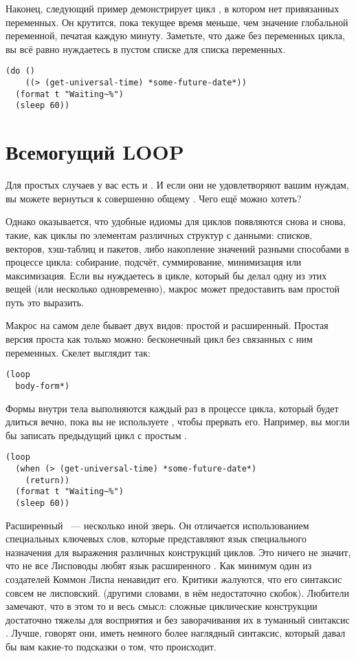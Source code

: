 Наконец, следующий пример демонстрирует цикл , в котором нет привязанных
переменных. Он крутится, пока текущее время меньше, чем значение глобальной переменной,
печатая  каждую минуту. Заметьте, что даже без переменных цикла, вы всё равно
нуждаетесь в пустом списке для списка переменных.

\begin{lstlisting}
(do ()
    ((> (get-universal-time) *some-future-date*))
  (format t "Waiting~%")
  (sleep 60)) 
\end{lstlisting}

\section{Всемогущий LOOP}

Для простых случаев у вас есть  и . И если они не удовлетворяют
вашим нуждам, вы можете вернуться к совершенно общему . Чего ещё можно хотеть?

Однако оказывается, что удобные идиомы для циклов появляются снова и снова, такие, как
циклы по элементам различных структур с данными: списков, векторов, хэш-таблиц и пакетов,
либо накопление значений разными способами в процессе цикла: собирание, подсчёт,
суммирование, минимизация или максимизация. Если вы нуждаетесь в цикле, который бы делал
одну из этих вещей (или несколько одновременно), макрос  может предоставить вам
простой путь это выразить.

Макрос  на самом деле бывает двух видов: простой и расширенный. Простая версия
проста как только можно: бесконечный цикл без связанных с ним переменных. Скелет выглядит
так:

\begin{lstlisting}
(loop
  body-form*)
\end{lstlisting}

Формы внутри тела выполняются каждый раз в процессе цикла, который будет длиться вечно,
пока вы не используете , чтобы прервать его. Например, вы могли бы записать
предыдущий  цикл с простым .

\begin{lstlisting}
(loop
  (when (> (get-universal-time) *some-future-date*)
    (return))
  (format t "Waiting~%")
  (sleep 60))
\end{lstlisting}

Расширенный ~--- несколько иной зверь. Он отличается использованием специальных
ключевых слов, которые представляют язык специального назначения для выражения различных
конструкций циклов. Это ничего не значит, что не все Лисповоды любят язык расширенного
. Как минимум один из создателей Коммон Лиспа ненавидит его. Критики
 жалуются, что его синтаксис совсем не лисповский. (другими словами, в нём
недостаточно скобок). Любители  замечают, что в этом то и весь смысл: сложные
циклические конструкции достаточно тяжелы для восприятия и без заворачивания их в туманный
синтаксис . Лучше, говорят они, иметь немного более наглядный синтаксис, который
давал бы вам какие-то подсказки о том, что происходит.

